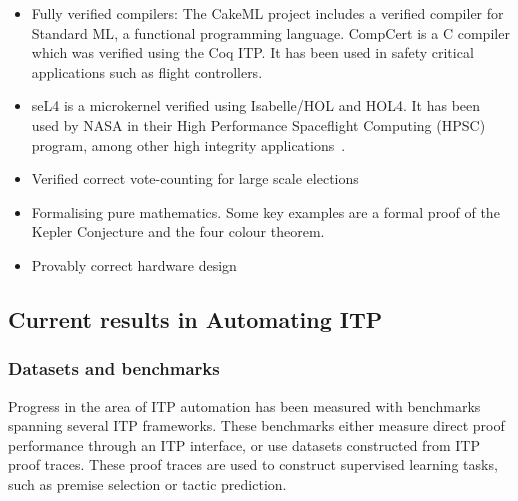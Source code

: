 \documentclass{article}
\begin{document}
    \begin{itemize}
        \item Fully verified compilers:
        The CakeML\cite{tan_verified_2019} project includes a verified compiler for Standard ML\cite{milner_definition_1997}, a functional programming language.
        CompCert\cite{leroy_compcert_2014} is a C compiler which was verified using the Coq ITP\@.
        It has been used in safety critical applications such as flight controllers\cite{franca_formally_2012}.
        \item seL4\cite{klein_sel4_2009} is a microkernel verified using Isabelle/HOL and HOL4\cite{heiser_sel4_2020}.
        It has been used by NASA in their High Performance Spaceflight Computing (HPSC) program\cite{noauthor_nasa_nodate}, among other high integrity applications~\cite{vanderleest_is_2018,matos_sel4_2022,heiser_sel4_australia_2020}.
        \item Verified correct vote-counting for large scale elections\cite{moses_no_2017}
        \item Formalising pure mathematics.
        Some key examples are a formal proof of the Kepler Conjecture\cite{hales_formal_2017} and the four colour theorem\cite{gonthier_four_2008}.
        \item Provably correct hardware design\cite{gupta_formal_1992,kern_formal_2002}
    \end{itemize}


    \subsection{Current results in Automating ITP}\label{subsec:current-results-in-automating-itp}
    \subsubsection{Datasets and benchmarks}
    Progress in the area of ITP automation has been measured with benchmarks spanning several ITP frameworks.
    These benchmarks either measure direct proof performance through an ITP interface, or use datasets constructed from ITP proof traces.
    These proof traces are used to construct supervised learning tasks, such as premise selection or tactic prediction. \\
\end{document}
